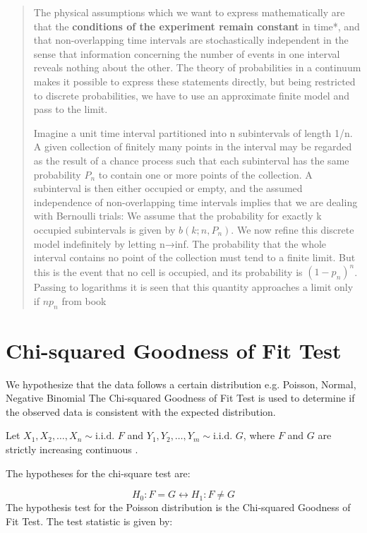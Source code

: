 \begin{quotation}
    The physical assumptions which we want to express mathematically are that the \textbf{conditions of the experiment remain constant} in time*, and that non-overlapping time intervals are stochastically independent in the sense that information concerning the number of events in one interval reveals nothing about the other. The theory of probabilities in a continuum makes it possible to express these statements directly, but being restricted to discrete probabilities, we have to use an approximate finite model and pass to the limit.

    Imagine a unit time interval partitioned into n subintervals of length 1/n. A given collection of finitely many points in the interval may be regarded as the result of a chance process such that each subinterval has the same probability $P_{n}$ to contain one or more points of the collection. A subinterval is then either occupied or empty, and the assumed independence of non-overlapping time intervals implies that we are dealing with Bernoulli trials: We assume that the probability for exactly k occupied subintervals is given by $b(k;n,P_{n})$. We now refine this discrete model indefinitely by letting n→inf. The probability that the whole interval contains no point of the collection must tend to a finite limit. But this is the event that no cell is occupied, and its probability is $(1-p_{n})^{n}$. Passing to logarithms it is seen that this quantity approaches a limit only if $np_{n}$
    from book \cite{fellerIntroductionProbabilityTheory1968}
\end{quotation}

\section{Chi-squared Goodness of Fit Test}
We hypothesize that the data follows a certain distribution e.g. Poisson, Normal, Negative Binomial The Chi-squared Goodness of Fit Test is used to determine if the observed data is consistent with the expected distribution.

Let \( X_1, X_2, \ldots, X_n \sim \text{i.i.d. } F \) and \( Y_1, Y_2, \ldots, Y_m \sim \text{i.i.d. } G \), where \( F \) and \( G \) are strictly increasing continuous .

The hypotheses for the chi-square test are:

\begin{equation}
    H_0: F = G \leftrightarrow   H_1: F \neq G
\end{equation}
The hypothesis test for the Poisson distribution is the Chi-squared Goodness of Fit Test. The test statistic is given by:


